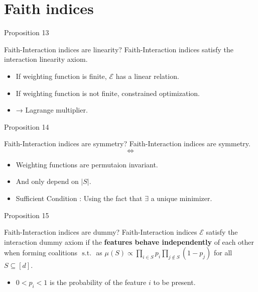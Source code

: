 \documentclass[10pt]{beamer}
\newcommand{\ex}{\Expl}
\def\Expl{\mathcal{E}}
\begin{document}
\section[Faith interaction index]{Faith indices}
\begin{frame}{Proposition 13}
    \begin{myaxiombox}{Faith-Interaction indices are linearity?}
         Faith-Interaction indices satisfy the interaction linearity axiom.
    \end{myaxiombox}
    \vspace{1.5em}
    \begin{itemize}[label=\scalebox{0.5}{$\blacksquare$}]
        \item If weighting function is finite, $\ex$ has a linear relation.
        \item If weighting function is not finite, constrained optimization.    \item → Lagrange multiplier.
    \end{itemize}
\end{frame}
\begin{frame}{Proposition 14}
    \begin{myaxiombox}{Faith-Interaction indices are symmetry?}
        Faith-Interaction indices are symmetry.
        \[\iff\]
        \begin{itemize}
            \item Weighting functions are permutaion invariant.
            \item And only depend on $|S|$.
        \end{itemize}
    \end{myaxiombox}
    \begin{itemize}[label=\scalebox{0.5}{$\blacksquare$}]
        \item Sufficient Condition : Using the fact that $\exists$ a unique minimizer.
    \end{itemize}
\end{frame}
\begin{frame}{Proposition 15}
    \begin{myaxiombox}{Faith-Interaction indices are dummy?}
        Faith-Interaction indices $\Expl$ satisfy the interaction dummy axiom if the \textbf{features behave independently} of each other when forming coalitions $\text{ s.t. }$ as $\mu(S) \propto \prod_{i \in S} p_i \prod_{j \not \in S} (1-p_j)$ for all $S \subseteq [d]$.
    \end{myaxiombox}
    \begin{itemize}[label=\scalebox{0.5}{$\blacksquare$}]
        \item $0 < p_i < 1$ is the probability of the feature $i$ to be present.
    \end{itemize}
\end{frame}
\end{document}
